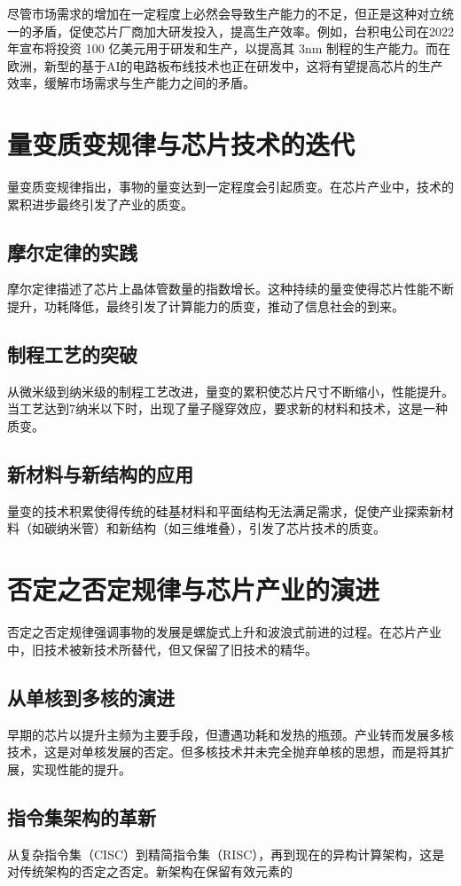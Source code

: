 \documentclass[12pt,hyperref,a4paper,UTF8]{ctexart}
\begin{document}
尽管市场需求的增加在一定程度上必然会导致生产能力的不足，但正是这种对立统一的矛盾，促使芯片厂商加大研发投入，提高生产效率。例如，台积电公司在2022年宣布将投资 100 亿美元用于研发和生产，以提高其 3nm 制程的生产能力。而在欧洲，新型的基于AI的电路板布线技术也正在研发中，这将有望提高芯片的生产效率，缓解市场需求与生产能力之间的矛盾。

\section{量变质变规律与芯片技术的迭代}

量变质变规律指出，事物的量变达到一定程度会引起质变。在芯片产业中，技术的累积进步最终引发了产业的质变。

\subsection{摩尔定律的实践}

摩尔定律描述了芯片上晶体管数量的指数增长。这种持续的量变使得芯片性能不断提升，功耗降低，最终引发了计算能力的质变，推动了信息社会的到来。

\subsection{制程工艺的突破}

从微米级到纳米级的制程工艺改进，量变的累积使芯片尺寸不断缩小，性能提升。当工艺达到7纳米以下时，出现了量子隧穿效应，要求新的材料和技术，这是一种质变。

\subsection{新材料与新结构的应用}

量变的技术积累使得传统的硅基材料和平面结构无法满足需求，促使产业探索新材料（如碳纳米管）和新结构（如三维堆叠），引发了芯片技术的质变。

\section{否定之否定规律与芯片产业的演进}

否定之否定规律强调事物的发展是螺旋式上升和波浪式前进的过程。在芯片产业中，旧技术被新技术所替代，但又保留了旧技术的精华。

\subsection{从单核到多核的演进}

早期的芯片以提升主频为主要手段，但遭遇功耗和发热的瓶颈。产业转而发展多核技术，这是对单核发展的否定。但多核技术并未完全抛弃单核的思想，而是将其扩展，实现性能的提升。

\subsection{指令集架构的革新}

从复杂指令集（CISC）到精简指令集（RISC），再到现在的异构计算架构，这是对传统架构的否定之否定。新架构在保留有效元素的


\end{document}
